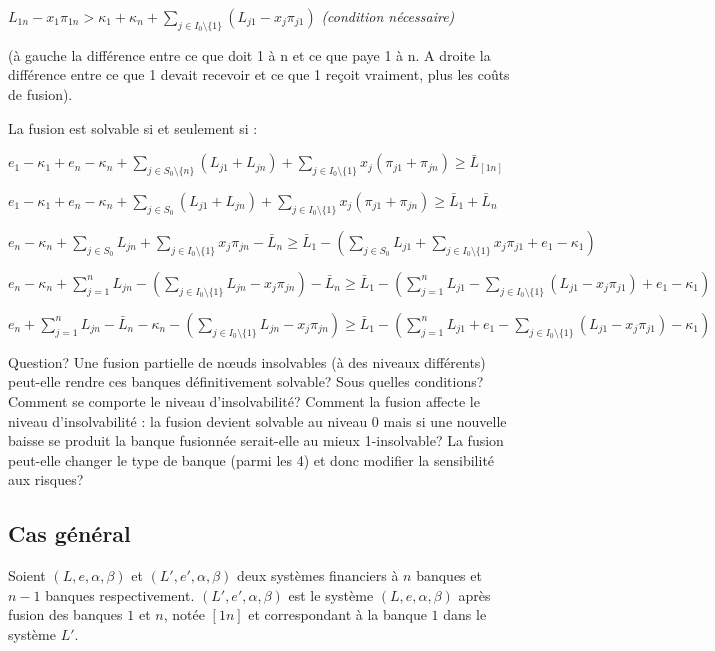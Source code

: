 \documentclass[11pt,oneside,twocolumn]{article}
\begin{document}
$L_{1n} - x_{1} \pi_{1n}> \kappa_{1} + \kappa_{n} + \sum_{j \in I_{0}\setminus \lbrace 1 \rbrace} (L_{j1} - x_{j} \pi_{j1})  $ \textit{(condition nécessaire)}

(à gauche la différence entre ce que doit 1 à n et ce que paye 1 à n. A droite la différence entre ce que 1 devait recevoir et ce que 1 reçoit vraiment, plus les coûts de fusion).


La fusion est solvable si et seulement si :

$e_{1} - \kappa_{1} + e_{n} - \kappa_{n} + \sum_{j \in S_{0}\setminus \lbrace n \rbrace} (L_{j1} + L_{jn}) + \sum_{j \in I_{0}\setminus \lbrace 1 \rbrace} x_{j}(\pi_{j1} + \pi_{jn}) \geq \bar L_{\left[1n \right]}$

$e_{1} - \kappa_{1} + e_{n} - \kappa_{n} + \sum_{j \in S_{0}} (L_{j1} + L_{jn}) + \sum_{j \in I_{0}\setminus \lbrace 1 \rbrace} x_{j}(\pi_{j1} + \pi_{jn}) \geq \bar L_{1} + \bar L_{n}$

$ e_{n} - \kappa_{n} + \sum_{j \in S_{0}} L_{jn} + \sum_{j \in I_{0}\setminus \lbrace 1 \rbrace} x_{j}\pi_{jn} - \bar L_{n} \geq \bar L_{1}  - (\sum_{j \in S_{0}} L_{j1} + \sum_{j \in I_{0}\setminus \lbrace 1 \rbrace} x_{j}\pi_{j1} + e_{1} - \kappa_{1})$

$ e_{n} - \kappa_{n} + \sum_{j=1}^{n} L_{jn} - (\sum_{j \in I_{0}\setminus \lbrace 1 \rbrace} L_{jn} - x_{j}\pi_{jn}) - \bar L_{n} \geq \bar L_{1}  - (\sum_{j=1}^{n} L_{j1} - \sum_{j \in I_{0}\setminus \lbrace 1 \rbrace} (L_{j1} - x_{j}\pi_{j1})  + e_{1} - \kappa_{1})$

$ e_{n}  + \sum_{j=1}^{n} L_{jn} - \bar L_{n}- \kappa_{n} - (\sum_{j \in I_{0}\setminus \lbrace 1 \rbrace} L_{jn} - x_{j}\pi_{jn})  \geq \bar L_{1}  - (\sum_{j=1}^{n} L_{j1} + e_{1} - \sum_{j \in I_{0}\setminus \lbrace 1 \rbrace} (L_{j1} - x_{j}\pi_{j1})   - \kappa_{1})$

Question? Une fusion partielle de nœuds insolvables (à des niveaux différents) peut-elle rendre ces banques définitivement solvable? Sous quelles conditions? Comment se comporte le niveau d'insolvabilité? Comment la fusion affecte le niveau d'insolvabilité : la fusion devient solvable au niveau 0 mais si une nouvelle baisse se produit la banque fusionnée serait-elle au mieux 1-insolvable? La fusion peut-elle changer le type de banque (parmi les 4) et donc modifier la sensibilité aux risques?

\subsection{Cas général}
Soient $(L, e, \alpha, \beta)$ et $(L', e', \alpha, \beta)$ deux systèmes financiers à $n$ banques et $n-1$ banques respectivement. $(L', e', \alpha, \beta)$ est le système $(L, e, \alpha, \beta)$ après fusion des banques $1$ et $n$, notée $\left[1n \right]$ et correspondant à la banque $1$ dans le système $L'$.
\end{document}
